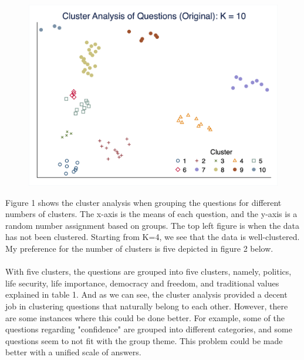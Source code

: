 \documentclass[10pt,leqno]{article}
\begin{document}
\begin{figure}  [h!]
\begin{center}
\includegraphics[scale=0.15]{CA_QuestionK10_ORI.png}
\end{center}
\end{figure}  

Figure 1 shows the cluster analysis when grouping the questions for different numbers of clusters. The x-axis is the means of each question, and the y-axis is a random number assignment based on groups. The top left figure is when the data has not been clustered. Starting from K=4, we see that the data is well-clustered. My preference for the number of clusters is five depicted in figure 2 below. \\
\\
With five clusters, the questions are grouped into five clusters, namely, politics, life security, life importance, democracy and freedom, and traditional values explained in table 1. And as we can see, the cluster analysis provided a decent job in clustering questions that naturally belong to each other. However, there are some instances where this could be done better. For example, some of the questions regarding "confidence" are grouped into different categories, and some questions seem to not fit with the group theme. This problem could be made better with a unified scale of answers.
\end{document}
